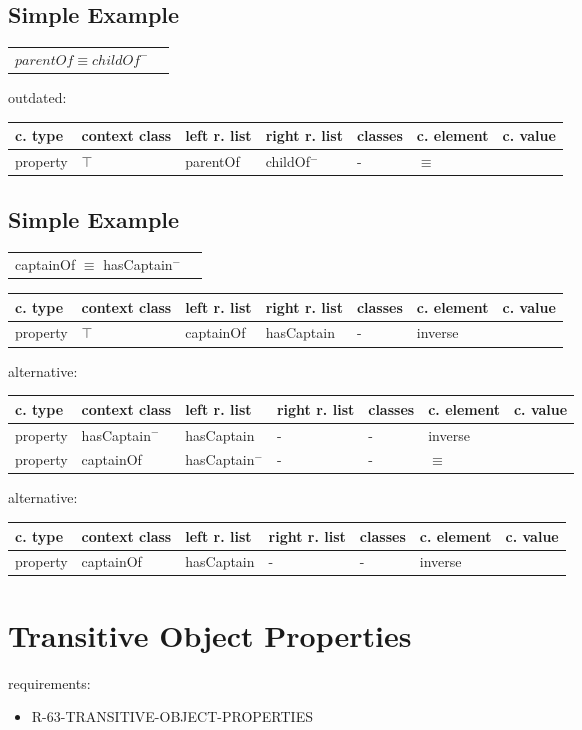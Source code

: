 \documentclass{llncs}
\newenvironment{gcotable}{
  \scriptsize
  \sffamily
  \vspace{0.3cm}
	\begin{center}
  \begin{tabular}{l|l|l|l|l|l|l}
  \hline
  \textbf{c. type} & \textbf{context class} & \textbf{left r. list} & \textbf{right r. list} & \textbf{classes} & \textbf{c. element} & \textbf{c. value} \\
  \hline

}{
  \hline
  \end{tabular}
	\end{center}
}
\newenvironment{DL}{
	\begin{center}
  \begin{tabular}{r l}

}{
  \end{tabular}
	\end{center}
}
\begin{document}
\subsection{Simple Example}

\begin{DL}
$parentOf \equiv childOf^{-}$ \\
\end{DL}

outdated:

\begin{gcotable}
property & $\top$ & parentOf & childOf$^{-}$ & - & $\equiv$ \\
\end{gcotable}

\subsection{Simple Example}

\begin{DL}
captainOf $\equiv$ hasCaptain$^{-}$ \\
\end{DL}

\begin{gcotable}
property & $\top$ & captainOf & hasCaptain & - & inverse \\
\end{gcotable}

alternative:

\begin{gcotable}
property & hasCaptain$^{-}$ & hasCaptain & - & - & inverse \\
property & captainOf & hasCaptain$^{-}$ & - & - & $\equiv$ \\
\end{gcotable}

alternative:

\begin{gcotable}
property & captainOf & hasCaptain & - & - & inverse \\
\end{gcotable}

\section{Transitive Object Properties}

requirements:

\begin{itemize}
	\item R-63-TRANSITIVE-OBJECT-PROPERTIES
\end{itemize}
\end{document}
